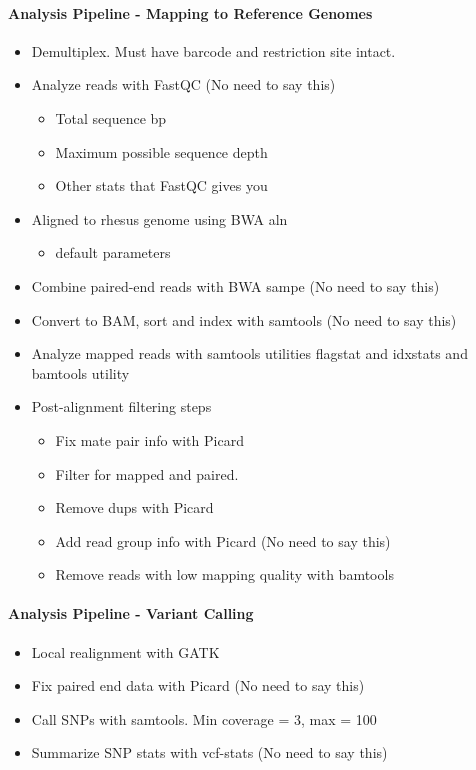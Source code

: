 \documentclass[12pt]{article}
\begin{document}
\paragraph{Analysis Pipeline - Mapping to Reference Genomes}
\begin{itemize}
	\item Demultiplex. Must have barcode and restriction site intact.
	\item Analyze reads with FastQC (No need to say this)
	\begin{itemize}
		\item Total sequence bp
		\item Maximum possible sequence depth
		\item Other stats that FastQC gives you
	\end{itemize}
	\item Aligned to rhesus genome using BWA aln
	\begin{itemize}
		\item default parameters
	\end{itemize}
	\item Combine paired-end reads with BWA sampe (No need to say this)
	\item Convert to BAM, sort and index with samtools (No need to say this)
	\item Analyze mapped reads with samtools utilities flagstat and idxstats and bamtools utility 
	\item Post-alignment filtering steps
	\begin{itemize}
		\item Fix mate pair info with Picard
		\item Filter for mapped and paired.
		\item Remove dups with Picard
		\item Add read group info with Picard (No need to say this)
		\item Remove reads with low mapping quality with bamtools
	\end{itemize}
\end{itemize}

\paragraph{Analysis Pipeline - Variant Calling}
\begin{itemize}
	\item Local realignment with GATK
	\item Fix paired end data with Picard (No need to say this)
	\item Call SNPs with samtools. Min coverage = 3, max = 100
	\item Summarize SNP stats with vcf-stats (No need to say this)
\end{itemize}
\end{document}

